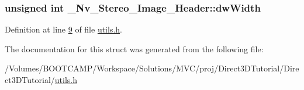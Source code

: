 \hypertarget{struct___nv___stereo___image___header_a495218c0378e538de8c3504daa0a0846}{
\subsubsection[{dwWidth}]{\setlength{\rightskip}{0pt plus 5cm}unsigned int {\bf \_\-Nv\_\-Stereo\_\-Image\_\-Header::dwWidth}}}
\label{struct___nv___stereo___image___header_a495218c0378e538de8c3504daa0a0846}


Definition at line \hyperlink{utils_8h_source_l00009}{9} of file \hyperlink{utils_8h_source}{utils.h}.



The documentation for this struct was generated from the following file:\begin{DoxyCompactItemize}
\item 
/Volumes/BOOTCAMP/Workspace/Solutions/MVC/proj/Direct3DTutorial/Direct3DTutorial/\hyperlink{utils_8h}{utils.h}\end{DoxyCompactItemize}
